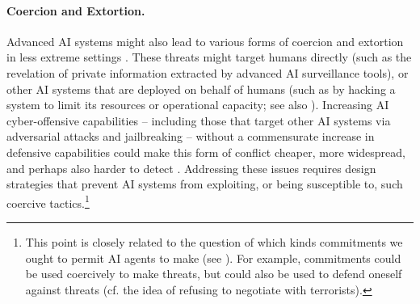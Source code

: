 \paragraph{Coercion and Extortion.}
Advanced AI systems might also lead to various forms of {coercion and extortion} in less extreme settings \citep{ellsberg1968theory,harrenstein2007commitment}.
These threats might target humans directly (such as the revelation of private information extracted by advanced AI surveillance tools), or other AI systems that are deployed on behalf of humans (such as by hacking a system to limit its resources or operational capacity; see also ).
Increasing AI cyber-offensive capabilities -- including those that target other AI systems via adversarial attacks and jailbreaking \citep{zou2023universaltransferableadversarialattacks,Gleave2020,yamin2021} -- without a commensurate increase in defensive capabilities could make this form of conflict cheaper, more widespread, and perhaps also harder to detect 
\citep{brundage2018malicious}.
Addressing these issues requires design strategies that prevent AI systems from exploiting, or being susceptible to, such coercive tactics.\footnote{This point is closely related to the question of which kinds commitments we ought to permit AI agents to make (see ). For example, commitments could be used coercively to make threats, but could also be used to defend oneself against threats (cf. the idea of refusing to negotiate with terrorists).}

